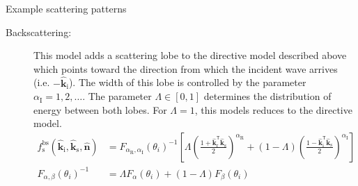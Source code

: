 \begin{highlightbox}{Example scattering patterns}
\begin{description}
    \item[Backscattering:] This model adds a scattering lobe to the directive model described above which points toward the direction from which the incident wave arrives (i.e. $-\hat{\mathbf{k}}_\text{i}$). The width of this lobe is controlled by the parameter $\alpha_\text{I}=1,2,\dots$. The parameter $\Lambda\in[0,1]$ determines the distribution of energy between both lobes. For $\Lambda=1$, this models reduces to the directive model.
    \begin{equation}
        \label{eq:backscattering_model}
        \begin{aligned}
            f^\text{bs}_\text{s}\left(\hat{\mathbf{k}}_\text{i}, \hat{\mathbf{k}}_\text{s}, \hat{\mathbf{n}}\right) &= F_{\alpha_\text{R}, \alpha_\text{I}}(\theta_i)^{-1} \left[ \Lambda \left(\frac{ 1 + \hat{\mathbf{k}}_\text{r}^\mathsf{T} \hat{\mathbf{k}}_\text{s}}{2}\right)^{\alpha_\text{R}} + (1-\Lambda) \left(\frac{ 1 - \hat{\mathbf{k}}_\text{i}^\mathsf{T} \hat{\mathbf{k}}_\text{s}}{2}\right)^{\alpha_\text{I}}\right]\\
            F_{\alpha, \beta}(\theta_i)^{-1} &= \Lambda F_\alpha(\theta_i) + (1-\Lambda)F_\beta(\theta_i)
        \end{aligned}
    \end{equation}
\end{description}
\end{highlightbox}
